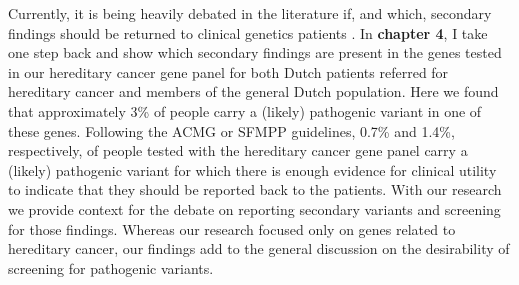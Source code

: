 Currently, it is being heavily debated in the literature if, and which, secondary findings should be returned to clinical genetics patients \cite{Hart_2018,Kalia_2016,Pujol_2018,Mackley_2016,Shkedi_Rafid_2014,Wouters_2018,van_El_2013}. 
In \textbf{chapter 4}, I take one step back and show which secondary findings are present in the genes tested in our hereditary cancer gene panel for both Dutch patients referred for hereditary cancer and members of
the general Dutch population. 
Here we found that approximately 3\% of people carry a (likely) pathogenic variant in one of these genes. 
Following the ACMG \cite{Green_2013,Kalia_2016} or SFMPP \cite{Pujol_2018} guidelines, 0.7\% and 1.4\%, respectively, of people tested with the hereditary cancer gene panel carry a (likely) pathogenic variant for which there is enough evidence for clinical utility to indicate that they should be reported back to the patients. 
With our research we provide context for the debate on reporting secondary variants and screening for those findings.
Whereas our research focused only on genes related to hereditary cancer, our findings add to the general discussion on the desirability of screening for pathogenic variants.


